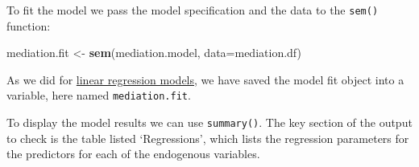 \documentclass[]{article}
\newenvironment{Shaded}{\begin{snugshade}}{\end{snugshade}}
\newcommand{\DataTypeTok}[1]{\textcolor[rgb]{0.13,0.29,0.53}{#1}}
\newcommand{\KeywordTok}[1]{\textcolor[rgb]{0.13,0.29,0.53}{\textbf{#1}}}
\newcommand{\NormalTok}[1]{#1}
\newcommand{\StringTok}[1]{\textcolor[rgb]{0.31,0.60,0.02}{#1}}
\begin{document}
To fit the model we pass the model specification and the data to the \texttt{sem()}
function:

\begin{Shaded}
\begin{Highlighting}[]
\NormalTok{mediation.fit <-}\StringTok{ }\KeywordTok{sem}\NormalTok{(mediation.model, }\DataTypeTok{data=}\NormalTok{mediation.df)}
\end{Highlighting}
\end{Shaded}

As we did for \protect\hyperlink{linear-models-simple}{linear regression models}, we have saved
the model fit object into a variable, here named \texttt{mediation.fit}.

To display the model results we can use \texttt{summary()}. The key section of the
output to check is the table listed `Regressions', which lists the regression
parameters for the predictors for each of the endogenous variables.
\end{document}
